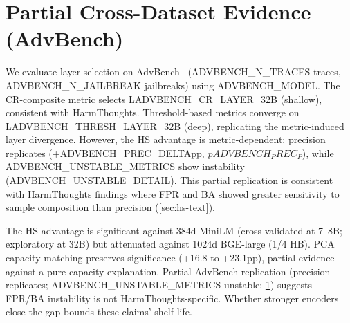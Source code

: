 

\section{Partial Cross-Dataset Evidence (AdvBench)}\label{app:advbench}

We evaluate layer selection on AdvBench~\citep{advbench} ({{ADVBENCH_N_TRACES}} traces, {{ADVBENCH_N_JAILBREAK}} jailbreaks) using {{ADVBENCH_MODEL}}. The CR-composite metric selects L{{ADVBENCH_CR_LAYER_32B}} (shallow), consistent with HarmThoughts. Threshold-based metrics converge on L{{ADVBENCH_THRESH_LAYER_32B}} (deep), replicating the metric-induced layer divergence. However, the HS advantage is metric-dependent: precision replicates (+{{ADVBENCH_PREC_DELTA}}pp, $p{{ADVBENCH_PREC_P}}$), while {{ADVBENCH_UNSTABLE_METRICS}} show instability ({{ADVBENCH_UNSTABLE_DETAIL}}). This partial replication is consistent with HarmThoughts findings where FPR and BA showed greater sensitivity to sample composition than precision (\cref{sec:hs-text}).


The HS advantage is significant against 384d MiniLM (cross-validated at 7--8B; exploratory at 32B) but attenuated against 1024d BGE-large (1/4 HB). PCA capacity matching preserves significance (+16.8 to +23.1pp), partial evidence against a pure capacity explanation. Partial AdvBench replication (precision replicates; {{ADVBENCH_UNSTABLE_METRICS}} unstable; \cref{app:advbench}) suggests FPR/BA instability is not HarmThoughts-specific. Whether stronger encoders~\citep{wang2024e5mistral,boxo2025linear_probes} close the gap bounds these claims' shelf life.





